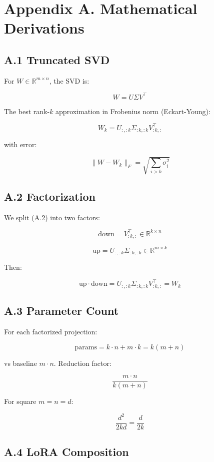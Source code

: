 \section{Appendix A. Mathematical Derivations}

\subsection{A.1 Truncated SVD}

For $W \in \mathbb{R}^{m \times n}$, the SVD is:

\[
W = U \Sigma V^\top
\]

The best rank-$k$ approximation in Frobenius norm (Eckart-Young):

\[
W_k = U_{:, :k} \Sigma_{:k, :k} V_{:k, :}^\top
\]

with error:

\[
\|W - W_k\|_F = \sqrt{\sum_{i > k} \sigma_i^2}
\]

\subsection{A.2 Factorization}

We split (A.2) into two factors:

\[
\text{down} = V_{:k, :}^\top \in \mathbb{R}^{k \times n}
\]

\[
\text{up} = U_{:, :k} \Sigma_{:k, :k} \in \mathbb{R}^{m \times k}
\]

Then:

\[
\text{up} \cdot \text{down} = U_{:, :k} \Sigma_{:k, :k} V_{:k, :}^\top = W_k
\]

\subsection{A.3 Parameter Count}

For each factorized projection:

\[
\text{params} = k \cdot n + m \cdot k = k(m + n)
\]

vs baseline $m \cdot n$. Reduction factor:

\[
\frac{m \cdot n}{k(m + n)}
\]

For square $m = n = d$:

\[
\frac{d^2}{2kd} = \frac{d}{2k}
\]

\subsection{A.4 LoRA Composition}

